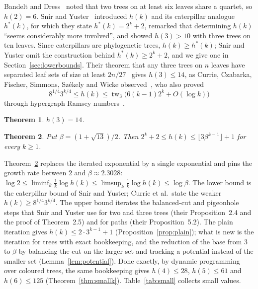 \documentclass[11pt]{amsart}
\newtheorem{theorem}{Theorem}[section]
\theoremstyle{remark}
\begin{document}
Bandelt and Dress~\cite{BD1986} noted that two trees on at least six leaves share a quartet, so $h(2)=6$. Snir and Yuster~\cite[Sec.~5]{SY2026} introduced $h(k)$ and its caterpillar analogue $h^*(k)$, for which they state $h^*(k)=2^k+2$, remarked that determining $h(k)$ ``seems considerably more involved'', and showed $h(3)>10$ with three trees on ten leaves. Since caterpillars are phylogenetic trees, $h(k)\ge h^*(k)$; Snir and Yuster omit the construction behind $h^*(k)\ge2^k+2$, and we give one in Section~\ref{sec:lowerbounds}. Their theorem that any three trees on $n$ leaves have separated leaf sets of size at least $2n/27$~\cite[Thm.~1.3]{SY2026} gives $h(3)\le14$, as Currie, Czabarka, Fischer, Simmons, Sz\'ekely and Wicke observed~\cite{CCFSSW2026}, who also proved
\[
8^{1/4}3^{k/4}\le h(k)\le \operatorname{tw}_3\bigl(6(k-1)2^k+O(\log k)\bigr)
\]
through hypergraph Ramsey numbers~\cite[Thm.~5]{CCFSSW2026}.

\begin{theorem}\label{thm:h3}
$h(3)=14$.
\end{theorem}

\begin{theorem}\label{thm:general}
Put $\beta=(1+\sqrt{13})/2$. Then $2^k+2\le h(k)\le\lfloor 3\beta^{k-1}\rfloor+1$ for every $k\ge1$.
\end{theorem}

Theorem~\ref{thm:general} replaces the iterated exponential by a single exponential and pins the growth rate between $2$ and $\beta\approx2.3028$: $\log2\le\liminf_k\tfrac1k\log h(k)\le\limsup_k\tfrac1k\log h(k)\le\log\beta$. The lower bound is the caterpillar bound of Snir and Yuster; Currie et al.\ state the weaker $h(k)\ge8^{1/4}3^{k/4}$. The upper bound iterates the balanced-cut and pigeonhole steps that Snir and Yuster use for two and three trees (their Proposition~2.4 and the proof of Theorem~2.5) and for paths (their Proposition~5.2). The plain iteration gives $h(k)\le2\cdot3^{k-1}+1$ (Proposition~\ref{prop:plain}); what is new is the iteration for trees with exact bookkeeping, and the reduction of the base from $3$ to $\beta$ by balancing the cut on the larger set and tracking a potential instead of the smaller set (Lemma~\ref{lem:potential}). Done exactly, by dynamic programming over coloured trees, the same bookkeeping gives $h(4)\le28$, $h(5)\le61$ and $h(6)\le125$ (Theorem~\ref{thm:smallk}). Table~\ref{tab:small} collects small values.
\end{document}
